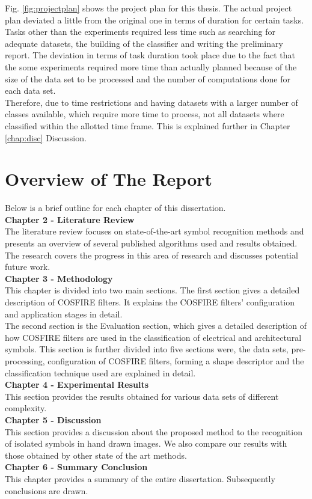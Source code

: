 Fig. \ref{fig:projectplan} shows the project plan for this thesis. The actual project plan deviated a little from the original one in terms of duration for certain tasks. Tasks other than the experiments required less time such as searching for adequate datasets, the building of the classifier and writing the preliminary report. The deviation in terms of task duration took place due to the fact that the some experiments required more time than actually planned because of the size of the data set to be processed and the number of computations done for each data set. \\

Therefore, due to time restrictions and having datasets with a larger number of classes available, which require more time to process,  not all datasets where classified  within the allotted time frame. This is explained further in Chapter \ref{chap:disc} Discussion.

\section {Overview of The Report}
Below is a brief outline for each chapter of this dissertation. \\
  
{\bf Chapter 2 - Literature Review} \\
The literature review focuses on state-of-the-art symbol recognition methods and presents an overview of several published algorithms used and results obtained. The research covers the progress in this area of research and discusses potential future work.\\

{\bf Chapter 3 - Methodology} \\
This chapter is divided into two main sections. The first section gives a detailed description of COSFIRE filters. It explains the COSFIRE filters' configuration and application stages in detail.\\

The second section is the Evaluation section, which gives a detailed description of how COSFIRE filters are used in the classification of electrical and architectural symbols. This section is further divided into five sections were, the data sets, pre-processing, configuration of COSFIRE filters, forming a shape descriptor and the classification technique used are explained in detail.\\

{\bf Chapter 4 - Experimental Results} \\
This section provides the results obtained for various data sets of different complexity. \\


{\bf Chapter 5 - Discussion} \\
This section provides a discussion about the proposed method to the recognition of isolated symbols in hand drawn images. We also compare our results with those obtained by other state of the art methods. \\

{\bf Chapter 6 - Summary Conclusion} \\
This chapter provides a summary of the entire dissertation. Subsequently conclusions are drawn.
  